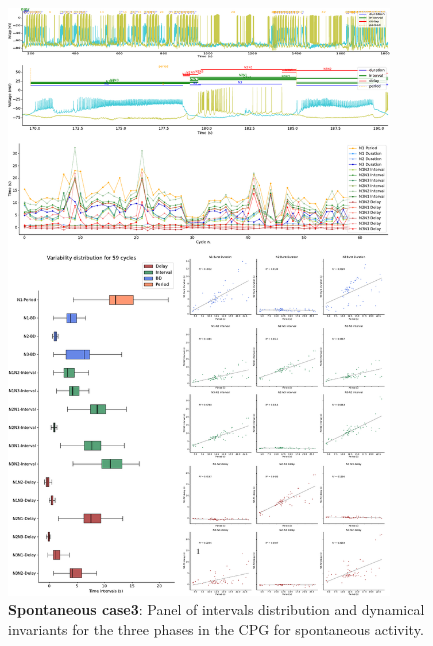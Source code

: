 \begin{figure}[htbp]
	\centering
	\includegraphics[width=0.9\textwidth]{./invariants/data/SUSSEX/prep3/images/3phases/panel_with_intervals.pdf}
	\caption{\textbf{Spontaneous case3}: Panel of intervals distribution and dynamical invariants for the three phases in the CPG for spontaneous activity.}
	\label{fig:prep3 invariants}
\end{figure}

